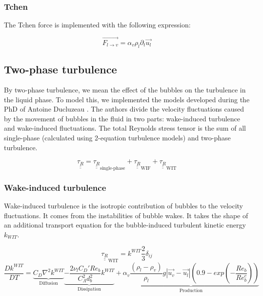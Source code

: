 \subsubsection{Tchen}

The Tchen force \cite{Tchen1947} is implemented with the following expression:

\begin{equation}
\overrightarrow{F_{l\rightarrow v}}= \alpha_v\rho_l \partial_t \overrightarrow{u_l}
\end{equation}

\subsection{Two-phase turbulence}

By two-phase turbulence, we mean the effect of the bubbles on the turbulence in the liquid phase. To model this, we implemented the models developed during the PhD of Antoine Ducluzeau \cite{DuCluzeau2019, Cluzeau2019, Cluzeau2019a}. The authors divide the velocity fluctuations caused by the movement of bubbles in the fluid in two parts: wake-induced turbulence and wake-induced fluctuations. The total Reynolds stress tensor is the sum of all single-phase (calculated using 2-equation turbulence models) and two-phase turbulence.

\begin{equation}
		\underline{\underline{\tau_R}} 
		=\underline{\underline{\tau_R}}_{\text{single-phase}}
		+ \underline{\underline{\tau_R}}_{\text{WIF}}
		+ \underline{\underline{\tau_R}}_{\text{WIT}}
\end{equation}

\subsubsection{Wake-induced turbulence} 

Wake-induced turbulence is the isotropic contribution of bubbles to the velocity fluctuations. It comes from the instabilities of bubble wakes. It takes the shape of an additional transport equation for the bubble-induced turbulent kinetic energy $k_{WIT}$.

\begin{equation}
	\underline{\underline{\tau_R}}_{\text{WIT}}
	= k^{WIT}\frac{2}{3}\delta_{ij}
\end{equation}
\begin{equation}
				\frac{D k^{WIT}}{DT} = 
				\underbrace{C_D\nabla^2 k^{WIT} }_\text{Diffusion} 
				\underbrace{ - \frac{2 \nu_l C_D' Re_b}{C_\Lambda^2 d_b^2}k^{WIT} }_\text{Dissipation}
				+ \underbrace{\alpha_v \frac{(\rho_l-\rho_v)}{\rho_l} g |\vec{u_v}-\vec{u_l}|\left(0.9 - exp\left(-\frac{Re_b}{Re_b^c}\right)\right) }_\text{Production}
\end{equation}

